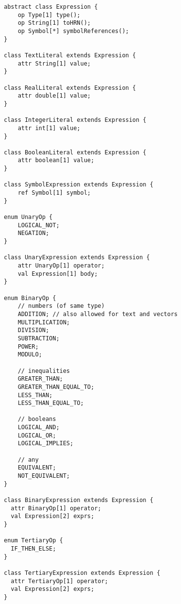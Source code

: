 \documentclass[11pt,fleqn]{article}
\begin{document}
\begin{lstlisting}[caption={Expression Language},label={lst:expression-language}]
abstract class Expression {
	op Type[1] type();
	op String[1] toHRN();
	op Symbol[*] symbolReferences();
}

class TextLiteral extends Expression {
	attr String[1] value;
}

class RealLiteral extends Expression {
	attr double[1] value;
}

class IntegerLiteral extends Expression {
	attr int[1] value;
}

class BooleanLiteral extends Expression {
	attr boolean[1] value;
}

class SymbolExpression extends Expression {
    ref Symbol[1] symbol;
}

enum UnaryOp {
	LOGICAL_NOT;
	NEGATION;
}

class UnaryExpression extends Expression {
	attr UnaryOp[1] operator;
	val Expression[1] body;
}

enum BinaryOp {
	// numbers (of same type)
	ADDITION; // also allowed for text and vectors
	MULTIPLICATION;
	DIVISION;
	SUBTRACTION;
	POWER;
	MODULO;

	// inequalities
	GREATER_THAN;
	GREATER_THAN_EQUAL_TO;
	LESS_THAN;
	LESS_THAN_EQUAL_TO;
	
	// booleans
	LOGICAL_AND;
	LOGICAL_OR;
	LOGICAL_IMPLIES;
	
	// any
	EQUIVALENT;
	NOT_EQUIVALENT;
}

class BinaryExpression extends Expression {
  attr BinaryOp[1] operator;
  val Expression[2] exprs;
}

enum TertiaryOp {
  IF_THEN_ELSE;
}

class TertiaryExpression extends Expression {
  attr TertiaryOp[1] operator;
  val Expression[2] exprs;
}
\end{lstlisting}
\end{document}
